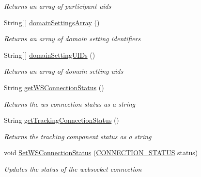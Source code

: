 \begin{DoxyCompactItemize}
\begin{DoxyCompactList}\small\item\em Returns an array of participant uids \end{DoxyCompactList}\item 
String\mbox{[}$\,$\mbox{]} \hyperlink{class_web_analyzer_1_1_u_i_1_1_interaction_objects_1_1_experiment_object_a150c4672bd1ed68b1db01cf2391107ec}{domain\+Settings\+Array} ()
\begin{DoxyCompactList}\small\item\em Returns an array of domain setting identifiers \end{DoxyCompactList}\item 
String\mbox{[}$\,$\mbox{]} \hyperlink{class_web_analyzer_1_1_u_i_1_1_interaction_objects_1_1_experiment_object_ad35fa2e95cd9c5b7f51a033bebe87beb}{domain\+Setting\+U\+I\+Ds} ()
\begin{DoxyCompactList}\small\item\em Returns an array of domain setting uids \end{DoxyCompactList}\item 
String \hyperlink{class_web_analyzer_1_1_u_i_1_1_interaction_objects_1_1_experiment_object_a752a6ca906248d36a0e4251a2bf16959}{get\+W\+S\+Connection\+Status} ()
\begin{DoxyCompactList}\small\item\em Returns the ws connection status as a string \end{DoxyCompactList}\item 
String \hyperlink{class_web_analyzer_1_1_u_i_1_1_interaction_objects_1_1_experiment_object_a2116c6efb6ed86405de36aaa6947045b}{get\+Tracking\+Connection\+Status} ()
\begin{DoxyCompactList}\small\item\em Returns the tracking component status as a string \end{DoxyCompactList}\item 
void \hyperlink{class_web_analyzer_1_1_u_i_1_1_interaction_objects_1_1_experiment_object_ad7c2424ce1f5611ec7fe303d362b959d}{Set\+W\+S\+Connection\+Status} (\hyperlink{class_web_analyzer_1_1_u_i_1_1_interaction_objects_1_1_experiment_object_a2875208b4f4b0ed643593152f4ec025c}{C\+O\+N\+N\+E\+C\+T\+I\+O\+N\+\_\+\+S\+T\+A\+T\+U\+S} status)
\begin{DoxyCompactList}\small\item\em Updates the status of the websocket connection \end{DoxyCompactList}\item 

\end{DoxyCompactItemize}
